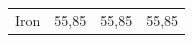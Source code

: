 {\begin{tabular}[t]{|l|l|l|l|}
    
        Iron &
    
    
        55,85 &
    
    
        55,85 &
    
    
        55,85%
     \tabularnewline\cline{1-1}\cline{2-2}\cline{3-3}\cline{4-4}
    \end{tabular}} %
        \addtolength{\mytableboxheight}{\mytableboxdepth}
        \addtocounter{footnote}{-0}
        
